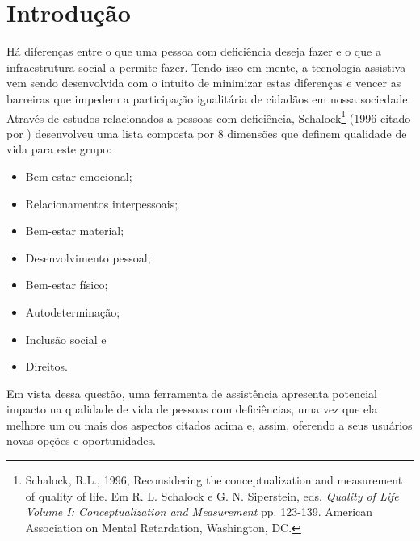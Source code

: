 \chapter{\label{chap:intro}Introdução}


Há diferenças entre o que uma pessoa com deficiência deseja fazer e o que a infraestrutura social a permite fazer. Tendo isso em mente, a tecnologia assistiva vem sendo desenvolvida com o intuito de minimizar estas diferenças e vencer as barreiras que impedem a participação igualitária de cidadãos em nossa sociedade. Através de estudos relacionados a pessoas com deficiência, Schalock\footnote{Schalock, R.L., 1996, Reconsidering the conceptualization and measurement of quality of life. Em R. L. Schalock e G. N. Siperstein, eds. \emph{Quality of Life Volume I: Conceptualization and Measurement} pp. 123-139. American Association on Mental Retardation, Washington, DC.} (1996 citado por \cite{hersh2010assistive}) desenvolveu uma lista composta por 8 dimensões que definem qualidade de vida para este grupo:
\begin{itemize}
    \item Bem-estar emocional;
    \item Relacionamentos interpessoais;
    \item Bem-estar material;
    \item Desenvolvimento pessoal;
    \item Bem-estar físico;
    \item Autodeterminação;
    \item Inclusão social e
    \item Direitos.
\end{itemize}
Em vista dessa questão, uma ferramenta de assistência apresenta potencial impacto na qualidade de vida de pessoas com deficiências, uma vez que ela melhore um ou mais dos aspectos citados acima e, assim, oferendo a seus usuários novas opções e oportunidades.

